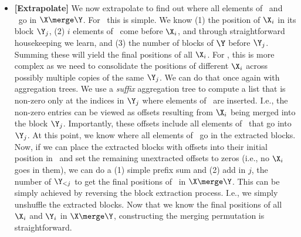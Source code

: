 \begin{itemize}
    \item \textbf{[Extrapolate]} We now extrapolate to find out where all elements of \X\ and \Y\ go in $\X \merge \Y$. For \X\ this is simple. We know (1) the position of $\X_i$ in its block $\Y_j$, (2) $i$ elements of \X\ come before $\X_i$, and through straightforward housekeeping we learn, and (3) the number of blocks of $\Y$ before $\Y_j$. Summing these will yield the final positions of all $\X_i$. For \Y, this is more complex as we need to consolidate the positions of different $\X_i$ across possibly multiple copies of the same $\Y_j$. We can do that once again with aggregation trees. We use a \emph{suffix} aggregation tree to compute a list that is non-zero only at the indices in $\Y_j$ where elements of \X\ are inserted. I.e., the non-zero entries can be viewed as offsets resulting from $\X_i$ being merged into the block $\Y_j$. Importantly, these offsets include all elements of \X\ that go into $\Y_j$. At this point, we know where all elements of \X\ go in the extracted blocks. Now, if we can place the extracted blocks with offsets into their initial position in \Y\ and set the remaining unextracted offsets to zeros (i.e., no $\X_i$ goes in them), we can do a (1) simple prefix sum and (2) add in $j$, the number of $\Y_{<j}$ to get the final positions of \Y\ in $\X \merge \Y$. This can be simply achieved by reversing the block extraction process. I.e., we simply unshuffle the extracted blocks. Now that we know the final positions of all $\X_i$ and $\Y_i$ in $\X \merge \Y$, constructing the merging permutation is straightforward.
    

\end{itemize}




